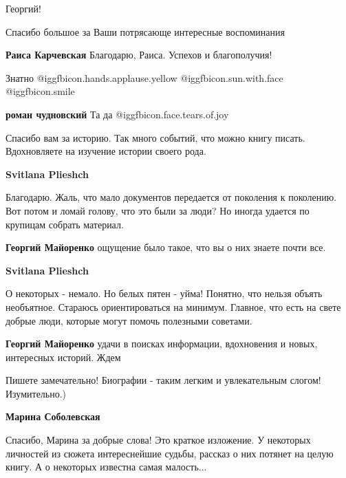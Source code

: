 \begin{itemize}

Георгий!

Спасибо большое за Ваши потрясающе интересные воспоминания

\begin{itemize} %
\textbf{Раиса Карчевская} Благодарю, Раиса. Успехов и благополучия!
\end{itemize} %

Знатно @igg{fbicon.hands.applause.yellow}  @igg{fbicon.sun.with.face}  @igg{fbicon.smile} 

\textbf{роман чудновский} Та да @igg{fbicon.face.tears.of.joy} 


Спасибо вам за историю. Так много событий, что можно книгу писать. Вдохновляете
на изучение истории своего рода.

\begin{itemize} %
\textbf{Svitlana Plieshch} 

Благодарю. Жаль, что мало документов передается от поколения к поколению. Вот
потом и ломай голову, что это были за люди? Но иногда удается по крупицам
собрать материал.

\textbf{Георгий Майоренко} ощущение было такое, что вы о них знаете почти все.

\textbf{Svitlana Plieshch} 

О некоторых - немало. Но белых пятен - уйма! Понятно, что нельзя объять
необъятное. Стараюсь ориентироваться на минимум. Главное, что есть на свете
добрые люди, которые могут помочь полезными советами.

\textbf{Георгий Майоренко} удачи в поисках информации, вдохновения и новых, интересных историй. Ждем
\end{itemize} %


Пишете замечательно! Биографии - таким легким и увлекательным слогом!
Изумительно.)

\begin{itemize} %
\textbf{Марина Соболевская} 

Спасибо, Марина за добрые слова! Это краткое изложение. У некоторых личностей
из сюжета интереснейшие судьбы, рассказ о них потянет на целую книгу. А о
некоторых известна самая малость...


\end{itemize}
\end{itemize}
